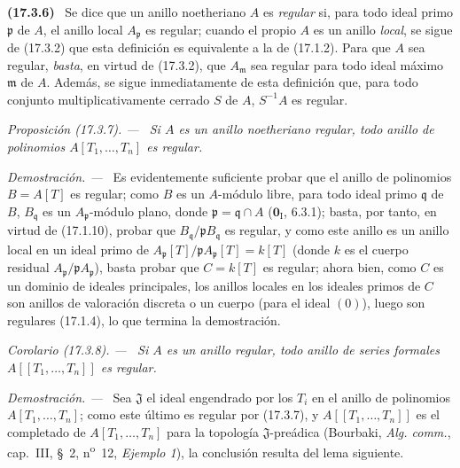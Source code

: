 \documentclass[10pt,oneside]{book}
\makeatletter
\newcommand{\setmanualcurrentlabel}[1]{\def\@currentlabel{#1}}
\newenvironment{env}[1][]{\setmanualcurrentlabel{#1}\par\medskip\noindent\textbf{(#1)}\ }{\par}
\newenvironment{proposition}[1][]{%
  \setmanualcurrentlabel{#1}\par\medskip\noindent\itshape Proposición (#1). ---\ }{\par}
\newenvironment{corollary}[1][]{%
  \setmanualcurrentlabel{#1}\par\medskip\noindent\itshape Corolario (#1). ---\ }{\par}
\newenvironment{proof}{%
  \par\medskip\noindent\textit{Demostración. ---\ }}{\par}
\makeatother
\begin{document}
\begin{env}[17.3.6]
\label{0.17.3.6-es}
Se dice que un anillo noetheriano $A$ es \emph{regular} si, para todo ideal
primo $\mathfrak{p}$ de $A$, el anillo local $A_{\mathfrak{p}}$ es regular;
cuando el propio $A$ es un anillo \emph{local}, se sigue de (17.3.2) que esta
definición es equivalente a la de (17.1.2). Para que $A$ sea regular, \emph{basta},
en virtud de (17.3.2), que $A_{\mathfrak{m}}$ sea regular para todo ideal
máximo $\mathfrak{m}$ de $A$. Además, se sigue inmediatamente de esta
definición que, para todo conjunto multiplicativamente cerrado $S$ de $A$,
$S^{-1}A$ es regular.
\end{env}

\begin{proposition}[17.3.7]
\label{0.17.3.7-es}
Si $A$ es un anillo noetheriano regular, todo anillo de polinomios
$A[T_1,\ldots,T_n]$ es regular.
\end{proposition}

\begin{proof}
Es evidentemente suficiente probar que el anillo de polinomios $B=A[T]$ es
regular; como $B$ es un $A$-módulo libre, para todo ideal primo
$\mathfrak{q}$ de $B$, $B_{\mathfrak{q}}$ es un
$A_{\mathfrak{p}}$-módulo plano, donde $\mathfrak{p}=\mathfrak{q}\cap A$
($\mathbf{0}_{\mathrm I}$, 6.3.1); basta, por tanto, en virtud de (17.1.10), probar que
$B_{\mathfrak{q}}/\mathfrak{p}B_{\mathfrak{q}}$ es regular, y como este anillo
es un anillo local en un ideal primo de
$A_{\mathfrak{p}}[T]/\mathfrak{p}A_{\mathfrak{p}}[T]=k[T]$ (donde $k$ es el
cuerpo residual $A_{\mathfrak{p}}/\mathfrak{p}A_{\mathfrak{p}}$), basta
probar que $C=k[T]$ es regular; ahora bien, como $C$ es un dominio de ideales
principales, los anillos locales en los ideales primos de $C$ son anillos de
valoración discreta o un cuerpo (para el ideal $(0)$), luego son regulares
(17.1.4), lo que termina la demostración.
\end{proof}

\begin{corollary}[17.3.8]
\label{0.17.3.8-es}
Si $A$ es un anillo regular, todo anillo de series formales
$A[[T_1,\ldots,T_n]]$ es regular.
\end{corollary}

\begin{proof}
Sea $\mathfrak{J}$ el ideal engendrado por los $T_i$ en el anillo de polinomios
$A[T_1,\ldots,T_n]$; como este último es regular por (17.3.7), y
$A[[T_1,\ldots,T_n]]$ es el completado de $A[T_1,\ldots,T_n]$ para la
topología $\mathfrak{J}$-preádica (Bourbaki, \emph{Alg. comm.}, cap.~III,
\S~2, n\textsuperscript{o}~12, \emph{Ejemplo 1}), la conclusión resulta del lema siguiente.
\end{proof}
\end{document}
